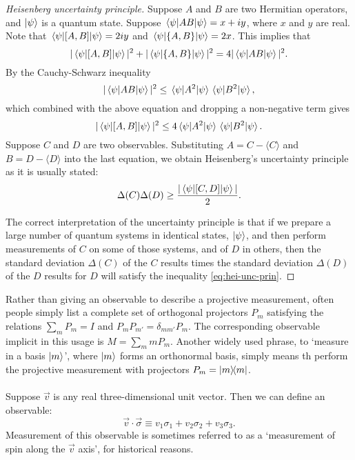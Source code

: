 \begin{proof}[Heisenberg uncertainty principle]
  Suppose $A$ and $B$ are two Hermitian operators, and $\ket{\psi}$ is a
  quantum state. Suppose $\mel{\psi}{AB}{\psi} = x + iy$, where $x$ and $y$ are
  real. Note that $\mel{\psi}{[A, B]}{\psi} = 2iy$ and $\mel{\psi}{\{A, B\}}
  {\psi} = 2x$. This implies that \begin{equation*}
    |\mel{\psi}{[A, B]}{\psi}|^2 + |\mel{\psi}{\{A, B\}}{\psi}|^2 =
      4|\mel{\psi}{AB}{\psi}|^2.
  \end{equation*} By the Cauchy-Schwarz inequality \begin{equation*}
    |\mel{\psi}{AB}{\psi}|^2 \leq \mel{\psi}{A^2}{\psi}\mel{\psi}{B^2}{\psi},
  \end{equation*} which combined with the above equation and dropping a
  non-negative term gives \begin{equation*}
    |\mel{\psi}{[A, B]}{\psi}|^2 \leq 4\mel{\psi}{A^2}{\psi}\mel{\psi}{B^2}
      {\psi}.
  \end{equation*} Suppose $C$ and $D$ are two observables. Substituting $A = C
  - \langle C \rangle$ and $B = D - \langle D \rangle$ into the last equation,
  we obtain Heisenberg's uncertainty principle as it is usually stated:
  \begin{equation*}
    \Delta(C)\Delta(D) \geq \frac{|\mel{\psi}{[C, D]}{\psi}|}{2}.
      \label{eq:hei-unc-prin}
  \end{equation*}

  The correct interpretation of the uncertainty principle is that if we prepare
  a large number of quantum systems in identical states, $\ket{\psi}$, and then
  perform measurements of $C$ on some of those systems, and of $D$ in others,
  then the standard deviation $\Delta(C)$ of the $C$ results times the standard
  deviation $\Delta(D)$ of the $D$ results for $D$ will satisfy the inequality
  \eqref{eq:hei-unc-prin}.
\end{proof}

Rather than giving an observable to describe a projective measurement, often
people simply list a complete set of orthogonal projectors $P_m$ satisfying the
relations $\sum_m P_m = I$ and $P_mP_{m'} = \delta_{mm'}P_m$. The corresponding
observable implicit in this usage is $M = \sum_m mP_m$. Another widely used
phrase, to `measure in a basis $\ket{m}$', where $\ket{m}$ forms an orthonormal
basis, simply means th perform the projective measurement with projectors $P_m
= \ketbra{m}{m}$.

\paragraph{} Suppose $\vec{v}$ is any real three-dimensional unit vector. Then
we can define an observable: \begin{equation*}
  \vec{v} \cdot \vec{\sigma} \equiv v_1\sigma_1 + v_2\sigma_2 + v_3\sigma_3.
\end{equation*} Measurement of this observable is sometimes referred to as a
`measurement of spin along the $\vec{v}$ axis', for historical reasons.

